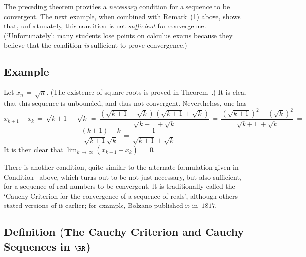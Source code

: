 \V

        The preceding theorem provides a {\em necessary} condition for a sequence to be convergent.
    The next example, when combined with Remark~(1) above, shows that, unfortunately, this condition is not {\em sufficient} for convergence.
    (`Unfortunately': many students lose points on calculus exams because they believe that the condition {\em is} sufficient to prove convergence.)

\V

            \subsection{\small{\bf Example}}
            \label{ExampC70.15}

\V

        Let $x_{n} \,=\, \sqrt{n}$. (The existence of square roots is proved in Theorem~.)
    It is clear that this sequence is unbounded, and thus not convergent. Nevertheless, one has
        \begin{displaymath}
        x_{k+1}-x_{k} \,=\, \sqrt{k+1} - \sqrt{k}
     \,=\, 
        \frac{(\sqrt{k+1} - \sqrt{k})\,(\sqrt{k+1} + \sqrt{k})}{\sqrt{k+1} + \sqrt{k}}
     \,=\, 
        \frac{(\sqrt{k+1})^{2} - (\sqrt{k})^{2}}{\sqrt{k+1} + \sqrt{k}}
     \,=\, 
        \end{displaymath}
        \begin{displaymath}
        \frac{(k+1) - k}{\sqrt{k+1}  \sqrt{k}}
     \,=\, 
        \frac{1}{\sqrt{k+1} + \sqrt{k}}
        \end{displaymath}
    It is then clear that $\lim_{k \,{\rightarrow}\, {\infty}} (x_{k+1} - x_{k}) \,=\, 0$.



\VV


        There is another condition, quite similar to the alternate formulation given in Condition~ above,
    which turns out to be not just necessary, but also sufficient, for a sequence of real numbers to be convergent.
    It is traditionally called the `Cauchy Criterion for the convergence of a sequence of reals',
    although others stated versions of it earlier; for example, Bolzano published it in~$1817$. %

\V

            \subsection{\small{\bf Definition} (The Cauchy Criterion and Cauchy Sequences in ${\RR}$)}
            \label{DefC70.40}

